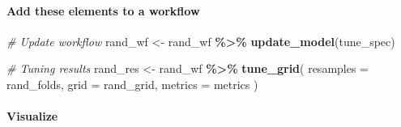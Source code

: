 \documentclass[
]{book}
\newenvironment{Shaded}{\begin{snugshade}}{\end{snugshade}}
\newcommand{\CommentTok}[1]{\textcolor[rgb]{0.56,0.35,0.01}{\textit{#1}}}
\newcommand{\DataTypeTok}[1]{\textcolor[rgb]{0.13,0.29,0.53}{#1}}
\newcommand{\KeywordTok}[1]{\textcolor[rgb]{0.13,0.29,0.53}{\textbf{#1}}}
\newcommand{\NormalTok}[1]{#1}
\newcommand{\OperatorTok}[1]{\textcolor[rgb]{0.81,0.36,0.00}{\textbf{#1}}}
\newcommand{\StringTok}[1]{\textcolor[rgb]{0.31,0.60,0.02}{#1}}
\begin{document}
\hypertarget{add-these-elements-to-a-workflow-2}{%
\paragraph{Add these elements to a workflow}\label{add-these-elements-to-a-workflow-2}}

\begin{Shaded}
\begin{Highlighting}[]
\CommentTok{\# Update workflow }
\NormalTok{rand\_wf \textless{}{-}}\StringTok{ }\NormalTok{rand\_wf }\OperatorTok{\%\textgreater{}\%}\StringTok{ }\KeywordTok{update\_model}\NormalTok{(tune\_spec)}

\CommentTok{\# Tuning results }
\NormalTok{rand\_res \textless{}{-}}\StringTok{ }\NormalTok{rand\_wf }\OperatorTok{\%\textgreater{}\%}
\StringTok{  }\KeywordTok{tune\_grid}\NormalTok{(}
    \DataTypeTok{resamples =}\NormalTok{ rand\_folds, }
    \DataTypeTok{grid =}\NormalTok{ rand\_grid,}
    \DataTypeTok{metrics =}\NormalTok{ metrics}
\NormalTok{  )}
\end{Highlighting}
\end{Shaded}

\hypertarget{visualize-2}{%
\paragraph{Visualize}\label{visualize-2}}
\end{document}
